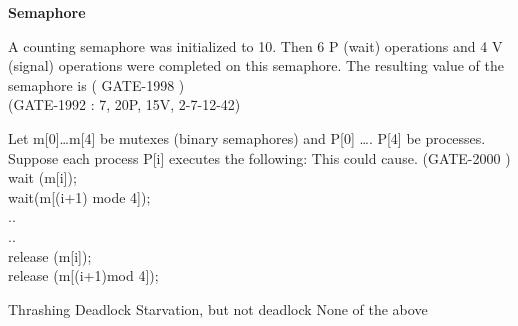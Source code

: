 \centerline{\textbf{ \LARGE Semaphore }}




\begin{minipage}{\linewidth}

  \question  A counting semaphore was initialized to 10. Then 6 P (wait) operations and 4 V (signal) operations were completed on this semaphore. The resulting value of the semaphore is ( GATE-1998 )
  \\ (GATE-1992 :  7, 20P, 15V, 2-7-12-42)
  \begin{choices}
  \end{choices}

  \end{minipage}

\vspace{0.08in}

\begin{minipage}{\linewidth}

  \question   Let m[0]…m[4] be mutexes (binary semaphores) and P[0] …. P[4] be processes.
              Suppose each process P[i] executes the following: This could cause. (GATE-2000 ) \\
              wait (m[i]); \\
              wait(m[(i+1) mode 4]); \\
              ..\\
              ..\\
              release (m[i]);\\
              release (m[(i+1)mod 4]);

  \begin{oneparchoices}
    \choice Thrashing
    \choice Deadlock
    \choice Starvation, but not deadlock
    \choice None of the above
  \end{oneparchoices}

  \end{minipage}

\vspace{0.08in}

